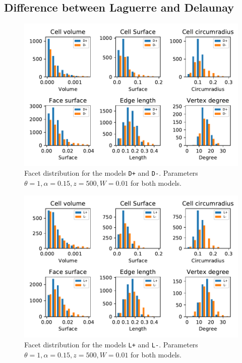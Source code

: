 
\subsection{Difference between Laguerre and Delaunay}


\begin{figure}
  \centering
    \includegraphics[width=1\textwidth]{../img/numeric/facets_D+_D-.pdf}
  \caption{Facet distribution for the models \texttt{D+} and \texttt{D-}. Parameters $\theta = 1,\alpha = 0.15, z=500, W=0.01$ for both models.}
\end{figure}

\begin{figure}
  \centering
    \includegraphics[width=1\textwidth]{../img/numeric/facets_L+_L-.pdf}
  \caption{Facet distribution for the models \texttt{L+} and \texttt{L-}. Parameters $\theta = 1,\alpha = 0.15, z=500, W=0.01$ for both models.}
\end{figure}

